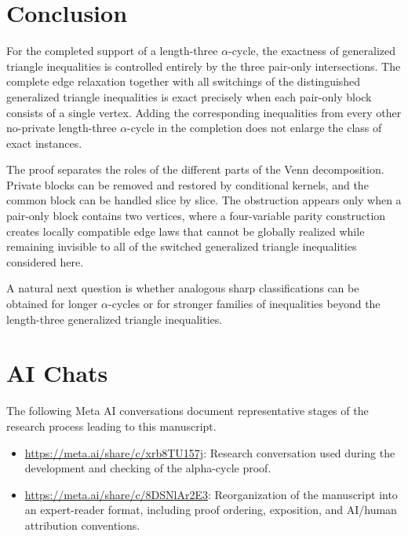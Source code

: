 \documentclass[11pt]{article}
\theoremstyle{definition}
\theoremstyle{remark}
\begin{document}
\section{Conclusion}
\begin{humanblock}
For the completed support of a length-three $\alpha$-cycle, the exactness of generalized triangle inequalities is controlled entirely by the three pair-only intersections. The complete edge relaxation together with all switchings of the distinguished generalized triangle inequalities is exact precisely when each pair-only block consists of a single vertex. Adding the corresponding inequalities from every other no-private length-three $\alpha$-cycle in the completion does not enlarge the class of exact instances.

The proof separates the roles of the different parts of the Venn decomposition. Private blocks can be removed and restored by conditional kernels, and the common block can be handled slice by slice. The obstruction appears only when a pair-only block contains two vertices, where a four-variable parity construction creates locally compatible edge laws that cannot be globally realized while remaining invisible to all of the switched generalized triangle inequalities considered here.

A natural next question is whether analogous sharp classifications can be obtained for longer $\alpha$-cycles or for stronger families of inequalities beyond the length-three generalized triangle inequalities.
\end{humanblock}

\appendix

\section{AI Chats}

The following Meta AI conversations document representative stages
of the research process leading to this manuscript.

\begin{itemize}

\item \url{https://meta.ai/share/c/xrb8TU157j}:
Research conversation used during the development and checking of the alpha-cycle proof.

\item \url{https://meta.ai/share/c/8DSNlAr2E3}:
Reorganization of the manuscript into an expert-reader format, including proof ordering, exposition, and AI/human attribution conventions.

\end{itemize}
\end{document}
